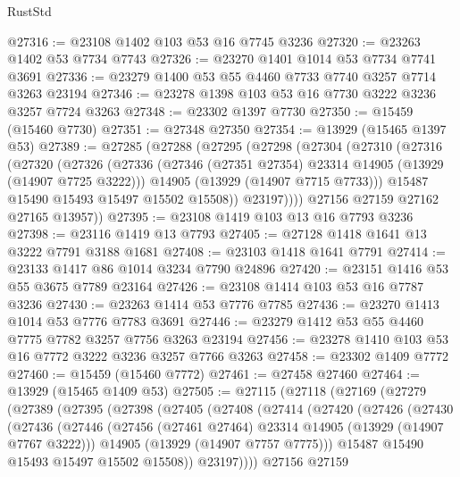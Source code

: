 \begin{lexlean}{RustStd}
\begin{coremodule}
@27316 := @23108 @1402 @103 @53 @16 @7745 @3236
@27320 := @23263 @1402 @53 @7734 @7743
@27326 := @23270 @1401 @1014 @53 @7734 @7741 @3691
@27336 := @23279 @1400 @53 @55 @4460 @7733 @7740 @3257 @7714 @3263 @23194
@27346 := @23278 @1398 @103 @53 @16 @7730 @3222 @3236 @3257 @7724 @3263
@27348 := @23302 @1397 @7730
@27350 := @15459 (@15460 @7730)
@27351 := @27348 @27350
@27354 := @13929 (@15465 @1397 @53)
@27389 := @27285
    (@27288
      (@27295
        (@27298
          (@27304
            (@27310
              (@27316
                (@27320
                  (@27326
                    (@27336
                      (@27346 (@27351 @27354) @23314 @14905 (@13929 (@14907 @7725 @3222)))
                      @14905
                      (@13929 (@14907 @7715 @7733)))
                    @15487
                    @15490
                    @15493
                    @15497
                    @15502
                    @15508))
                @23197))))
        @27156
        @27159
        @27162
        @27165
        @13957))
@27395 := @23108 @1419 @103 @13 @16 @7793 @3236
@27398 := @23116 @1419 @13 @7793
@27405 := @27128 @1418 @1641 @13 @3222 @7791 @3188 @1681
@27408 := @23103 @1418 @1641 @7791
@27414 := @23133 @1417 @86 @1014 @3234 @7790 @24896
@27420 := @23151 @1416 @53 @55 @3675 @7789 @23164
@27426 := @23108 @1414 @103 @53 @16 @7787 @3236
@27430 := @23263 @1414 @53 @7776 @7785
@27436 := @23270 @1413 @1014 @53 @7776 @7783 @3691
@27446 := @23279 @1412 @53 @55 @4460 @7775 @7782 @3257 @7756 @3263 @23194
@27456 := @23278 @1410 @103 @53 @16 @7772 @3222 @3236 @3257 @7766 @3263
@27458 := @23302 @1409 @7772
@27460 := @15459 (@15460 @7772)
@27461 := @27458 @27460
@27464 := @13929 (@15465 @1409 @53)
@27505 := @27115
    (@27118
      (@27169
        (@27279
          (@27389
            (@27395
              (@27398
                (@27405
                  (@27408
                    (@27414
                      (@27420
                        (@27426
                          (@27430
                            (@27436
                              (@27446
                                (@27456 (@27461 @27464) @23314 @14905 (@13929 (@14907 @7767 @3222)))
                                @14905
                                (@13929 (@14907 @7757 @7775)))
                              @15487
                              @15490
                              @15493
                              @15497
                              @15502
                              @15508))
                          @23197))))
                  @27156
                  @27159

\end{coremodule}
\end{lexlean}
